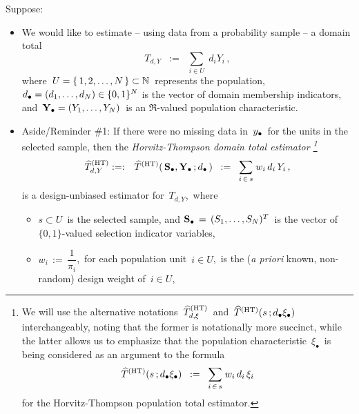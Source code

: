 Suppose:
\begin{itemize}
\item
    We would like to estimate
    -- using data from a probability sample --
    a domain total
    \begin{equation*}
    T_{d,Y}
    \;\; := \;\;
        \underset{i \in U}{\sum}\;d_{i}Y_{i}\,,
    \end{equation*}
    where \,$U = \{\,1,2,\ldots,N\,\} \subset \mathbb{N}$\, represents the population,
    $d_{\bullet} = (d_{1},\ldots,d_{N}) \in \{0,1\}^{N}$ is the vector of domain membership indicators,
    and
    \,$\mathbf{Y}_{\bullet} = (Y_{1},\ldots,Y_{N})$\,
    is an $\Re$-valued population characteristic.
\item
    Aside/Reminder \#1:
    \vskip 0.01cm
    \noindent
    If there were no missing data in \,$y_{\bullet}$\, for the units in the selected sample,
    then the \textit{Horvitz-Thompson domain total estimator\! \footnote{
        We will use the alternative notations
        \,$\widehat{T}_{d,\xi}^{\textnormal{(HT)}}$\,
        and
        \,$\widehat{T}^{\textnormal{(HT)}}(s\,;d_{\bullet}\xi_{\bullet})$\,
        interchangeably, noting that the former is notationally more succinct,
        while the latter allows us to emphasize that the population characteristic
        \,$\xi_{\bullet}$\,
        is being considered as an argument to the formula
        \begin{equation*}
        \widehat{T}^{\textnormal{(HT)}}(s\,;d_{\bullet}\xi_{\bullet})
        \;\; := \;\;
            \underset{i\,\in\,s}{\sum}\;w_{i}\,d_{i}\,\xi_{i}
        \end{equation*}
        for the Horvitz-Thompson population total estimator.
        }
    }
    \begin{eqnarray*}
    \widehat{T}^{\textnormal{(HT)}}_{d,Y}
    & :=: &
        \widehat{T}^{\textnormal{(HT)}}(\,\mathbf{S}_{\bullet},\mathbf{Y}_{\bullet}\,;d_{\bullet}\,)
    \;\; := \;\;
        \underset{i\,\in\,s}{\sum}\;w_{i}\,d_{i}\,Y_{i}\,,
    \end{eqnarray*}
    is a design-unbiased estimator for
    \,$T_{d,Y}$,\,
    where
    \begin{itemize}
    \item
        $s \subset U$\, is the selected sample, and
        $\mathbf{S}_{\bullet} \,=\, (S_{1},\ldots,S_{N})^{T}$\,
        is the vector of $\{0,1\}$-valued selection indicator variables,
    \item
        $w_{i} \,:=\, \dfrac{1}{\pi_{i}}$,\, for each population unit \,$i \in U$,\,
        is the (\textit{a priori} known, non-random) design weight of \,$i \in U$,\,

\end{itemize}
\end{itemize}
